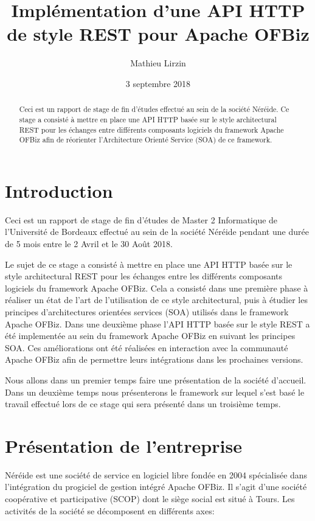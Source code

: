\documentclass[a4paper, 11pt]{report}
\title{Implémentation d'une API HTTP de style REST pour Apache OFBiz}
\author{Mathieu Lirzin}
\date{3 septembre 2018}
\begin{document}
\maketitle

\begin{abstract}
  Ceci est un rapport de stage de fin d'études effectué au sein de la
  société Néréide. Ce stage a consisté à mettre en place une API HTTP
  basée sur le style architectural REST pour les échanges entre
  différents composants logiciels du framework Apache OFBiz afin de
  réorienter l'Architecture Orienté Service (SOA) de ce framework.
\end{abstract}

\tableofcontents

\chapter*{Introduction}

Ceci est un rapport de stage de fin d'études de Master 2 Informatique
de l'Université de Bordeaux effectué au sein de la société Néréide
pendant une durée de 5 mois entre le 2 Avril et le 30 Août 2018.

Le sujet de ce stage a consisté à mettre en place une API HTTP basée
sur le style architectural REST pour les échanges entre les différents
composants logiciels du framework Apache OFBiz. Cela a consisté dans
une première phase à réaliser un état de l'art de l'utilisation de ce
style architectural, puis à étudier les principes d'architectures
orientées services (SOA) utilisés dans le framework Apache OFBiz.
Dans une deuxième phase l'API HTTP basée sur le style REST a été
implementée au sein du framework Apache OFBiz en suivant les principes
SOA. Ces améliorations ont été réalisées en interaction avec la
communauté Apache OFBiz afin de permettre leurs intégrations dans les
prochaines versions.

Nous allons dans un premier temps faire une présentation de la société
d'accueil. Dans un deuxième temps nous présenterons le framework sur
lequel s'est basé le travail effectué lors de ce stage qui sera
présenté dans un troisième temps.

\chapter{Présentation de l'entreprise}

Néréide est une société de service en logiciel libre fondée en 2004
spécialisée dans l'intégration du progiciel de gestion intégré Apache
OFBiz. Il s'agit d'une société coopérative et participative (SCOP)
dont le siège social est situé à Tours. Les activités de la société se
décomposent en différents axes:
\end{document}
